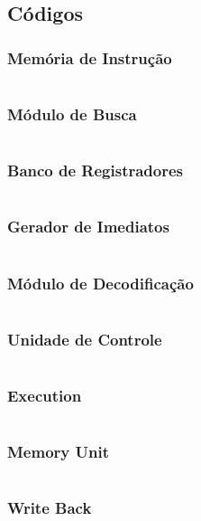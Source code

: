 \documentclass[12pt,a4paper,titlepage]{article}
\begin{document}
\subsection{Códigos}
\subsubsection{Memória de Instrução}
\inputminted{v}{./code/verilog/test/tb_instruction_memory.v}

\clearpage\subsubsection{Módulo de Busca}
\inputminted{v}{./code/verilog/test/tb_if_stage.v}

\clearpage\subsubsection{Banco de Registradores}
\inputminted{v}{./code/verilog/test/tb_register_file.v}

\clearpage\subsubsection{Gerador de Imediatos}
\inputminted{v}{./code/verilog/test/tb_imm_gen.v}

\clearpage\subsubsection{Módulo de Decodificação}
\inputminted{v}{./code/verilog/test/tb_id_stage.v}

\clearpage\subsubsection{Unidade de Controle}
\inputminted{v}{./code/verilog/test/tb_control_unit.v}

\clearpage\subsubsection{Execution}
\inputminted{v}{./code/verilog/test/tb_ex_stage.v}

\clearpage\subsubsection{Memory Unit}
\inputminted{v}{./code/verilog/test/tb_mem_stage.v}

\clearpage\subsubsection{Write Back}
\inputminted{v}{./code/verilog/test/tb_wb_stage.v}
\end{document}
